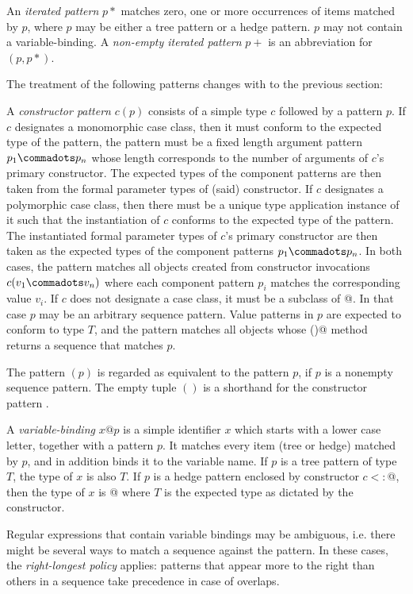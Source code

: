{An {\em iterated pattern} $p*$ matches zero, one or more occurrences 
of items matched by $p$, where $p$ may be either a tree pattern or a hedge pattern. $p$ may not 
contain a variable-binding. A {\em non-empty iterated pattern} $p+$ is an 
abbreviation for $(p,p*)$. 

The treatment of the following patterns changes with to the 
previous section:

A {\em constructor pattern} $c(p)$ consists of a simple type $c$
followed by a pattern $p$.  If $c$ designates a monomorphic case
class, then it must conform to the expected type of the pattern, the
pattern must be a fixed length argument pattern $p_1 \commadots p_n$
whose length corresponds to the number of arguments of $c$'s primary
constructor. The expected types of the component patterns are then
taken from the formal parameter types of (said) constructor.  If $c$
designates a polymorphic case class, then there must be a unique type
application instance of it such that the instantiation of $c$ conforms
to the expected type of the pattern. The instantiated formal parameter
types of $c$'s primary constructor are then taken as the expected
types of the component patterns $p_1\commadots p_n$.  In both cases,
the pattern matches all objects created from constructor invocations
$c(v_1 \commadots v_n)$ where each component pattern $p_i$ matches the
corresponding value $v_i$. If $c$ does not designate a case class, it
must be a subclass of \lstinline@Seq[$T\,$]@. In that case $p$ may be an
arbitrary sequence pattern. Value patterns in $p$ are expected to conform to
type $T$, and the pattern matches all objects whose \lstinline@elements()@
method returns a sequence that matches $p$.

The pattern $(p)$ is regarded as equivalent to the pattern $p$, if $p$
is a nonempty sequence pattern. The empty tuple $()$ is a shorthand
for the constructor pattern .

A {\em variable-binding} $x @ p$ is a simple identifier $x$
which starts with a lower case letter, together with a pattern $p$. It
matches every item (tree or hedge) matched by $p$, and in addition binds 
it to the variable name. If $p$ is a tree pattern of type $T$, the type 
of $x$ is also $T$.
If $p$ is a hedge pattern enclosed by constructor $c <: $\lstinline@Seq[$T\,$]@,
then the type of $x$ is \lstinline@List[$T\,$]@
where $T$ is the expected type as dictated by the constructor.

%
Regular expressions that contain variable bindings may be ambiguous,
i.e. there might be several ways to match a sequence against the
pattern. In these cases, the \emph{right-longest policy} applies:
patterns that appear more to the right than others in a sequence take
precedence in case of overlaps.

}
